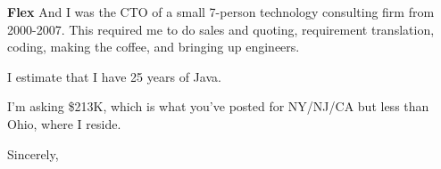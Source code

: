 \documentclass[11pt]{letter} %
\begin{document}
\begin{letter}{\large \bfseries Flex}
And I was the CTO of a small 7-person technology consulting firm from 2000-2007.  This
required me to do sales and quoting, requirement translation, coding, making the
coffee, and bringing up engineers.

I estimate that I have 25 years of Java.

I'm asking \$213K, which is what you've posted for NY/NJ/CA but less than Ohio, where I
reside.

\closing{Sincerely,}


\end{letter}
\end{document}
